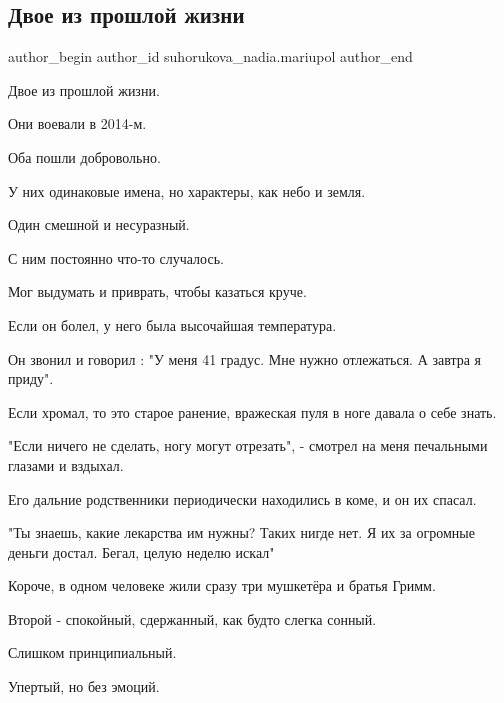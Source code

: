  
 
 
 
 
 
\subsection{Двое из прошлой жизни}
\label{sec:22_01_2023.tg.suhorukova_nadia.mariupol.1.dvoje_iz_proshloj_zhizni}
 
\ifcmt
 author_begin
   author_id suhorukova_nadia.mariupol
 author_end
\fi

Двое из прошлой жизни. 

Они воевали в 2014-м. 

Оба пошли добровольно. 

У них одинаковые имена, но характеры, как небо и земля. 

Один смешной и несуразный. 

С ним постоянно что-то случалось. 

Мог  выдумать и   приврать, чтобы казаться круче.  

Если он болел,  у него была  высочайшая температура. 

Он звонил и говорил : "У меня 41 градус. Мне нужно отлежаться. А завтра я
приду". 

Если хромал, то это старое ранение,  вражеская пуля в ноге давала о себе знать. 

"Если ничего не сделать,  ногу могут отрезать", -  смотрел на меня печальными
глазами и вздыхал. 

Его дальние  родственники периодически  находились в коме,  и он их спасал. 

"Ты знаешь, какие лекарства им нужны? Таких нигде нет. Я их за огромные деньги
достал. Бегал,  целую неделю искал"

Короче,  в одном человеке  жили  сразу три мушкетёра и братья Гримм.  

Второй -  спокойный,  сдержанный,  как будто слегка  сонный. 

Слишком принципиальный.

 Упертый, но без эмоций. 

